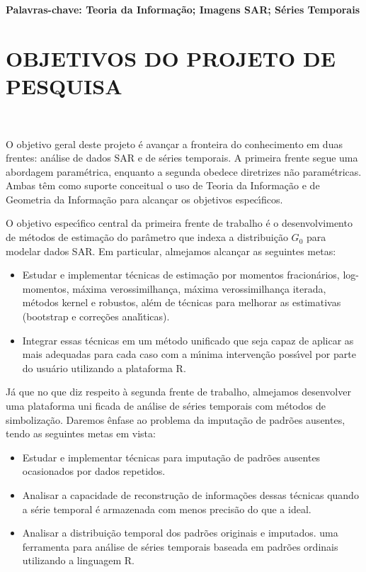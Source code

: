 \documentclass[12pt,letterpaper]{article}
\begin{document}
\textbf{Palavras-chave: Teoria da Informação; Imagens SAR; Séries Temporais} 


\newpage
\section*{\centering \textbf{OBJETIVOS DO PROJETO DE PESQUISA}}
\hrulefill \\

\vspace{0.5cm}

O objetivo geral deste projeto é avançar a fronteira do conhecimento em duas frentes: análise de dados SAR e de séries temporais. A primeira frente segue uma abordagem paramétrica, enquanto a segunda obedece diretrizes não paramétricas. Ambas têm como suporte conceitual o uso de Teoria da Informação e de Geometria da Informação para alcançar os objetivos especı́ficos.

O objetivo especı́fico central da primeira frente de trabalho é o desenvolvimento de métodos de estimação do parâmetro que indexa a distribuição $G_0$ para modelar dados SAR. Em particular, almejamos alcançar as seguintes metas:

\begin{itemize}
    \item  Estudar e implementar técnicas de estimação por momentos fracionários, log-momentos, máxima verossimilhança, máxima verossimilhança iterada, métodos kernel e robustos, além de técnicas para
melhorar as estimativas (bootstrap e correções analı́ticas).
    \item Integrar essas técnicas em um método unificado que seja capaz de aplicar as mais adequadas para cada caso com a mı́nima intervenção possı́vel por parte do usuário utilizando a plataforma R.
\end{itemize}
Já que no que diz respeito à segunda frente de trabalho, almejamos desenvolver uma plataforma uni ficada de análise de séries temporais com métodos de simbolização. Daremos ênfase ao problema da imputação de padrões ausentes, tendo as seguintes metas em vista:
\begin{itemize}
    \item Estudar e implementar técnicas para imputação de padrões ausentes ocasionados por dados repetidos.
    \item Analisar a capacidade de reconstrução de informações dessas técnicas quando a série temporal é armazenada com menos precisão do que a ideal.
    \item Analisar a distribuição temporal dos padrões originais e imputados.
    \itemDesenvolver uma ferramenta para análise de séries temporais baseada em padrões ordinais utilizando a linguagem R.

\end{itemize}
\end{document}
